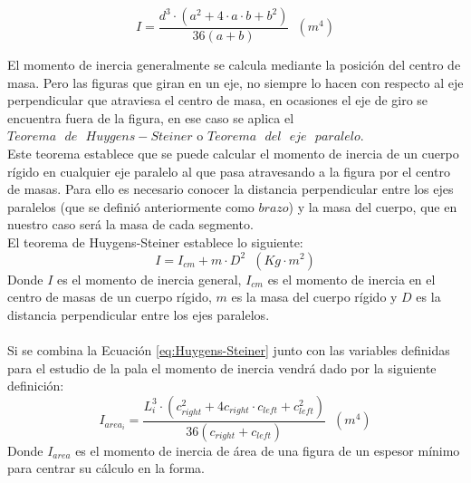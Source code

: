 \begin{equation}
    I = \dfrac{ d^3 \cdot (a^2 + 4 \cdot a \cdot b + b^2)}{ 36 (a + b)} \hspace{7pt} (m^4) 
\end{equation}




El momento de inercia generalmente se calcula mediante la posición del centro de masa. Pero las figuras que giran en un eje, no siempre lo hacen con respecto al eje perpendicular que atraviesa el centro de masa, en ocasiones el eje de giro se encuentra fuera de la figura, en ese caso se aplica el $Teorema \text{ } de \text{ } Huygens-Steiner$ o $Teorema \text{ } del \text{ } eje \text{ } paralelo$. \\

Este teorema establece que se puede calcular el momento de inercia de un cuerpo rígido en cualquier eje paralelo al que pasa atravesando a la figura por el centro de masas. Para ello es necesario conocer la distancia perpendicular entre los ejes paralelos (que se definió anteriormente como $brazo$) y la masa del cuerpo, que en nuestro caso será la masa de cada segmento. \\

El teorema de Huygens-Steiner establece lo siguiente:
 \begin{equation}
    I = I_{cm} + m \cdot D^2 \hspace{7pt} (Kg \cdot m^2)
 \label{eq:Huygens-Steiner}
 \end{equation}
 Donde $I$ es el momento de inercia general, $I_{cm}$ es el momento de inercia en el centro de masas de un cuerpo rígido, $m$ es la masa del cuerpo rígido y $D$ es la distancia perpendicular entre los ejes paralelos.\\\\
 

Si se combina la Ecuación \ref{eq:Huygens-Steiner} junto con las variables definidas para el estudio de la pala el momento de inercia vendrá dado por la siguiente definición:
 \begin{equation}
  I_{area_i} = \dfrac{ L_{i}^3 \cdot (c_{right}^2 + 4 c_{right} \cdot c_{left} + c_{left}^2)}{ 36 (c_{right} + c_{left})} \hspace{7pt} (m^4)
 \label{def:momento_inercia_area}
 \end{equation}
 Donde $I_{area}$ es el momento de inercia de área de una figura de un espesor mínimo para centrar su cálculo en la forma.\\
 

